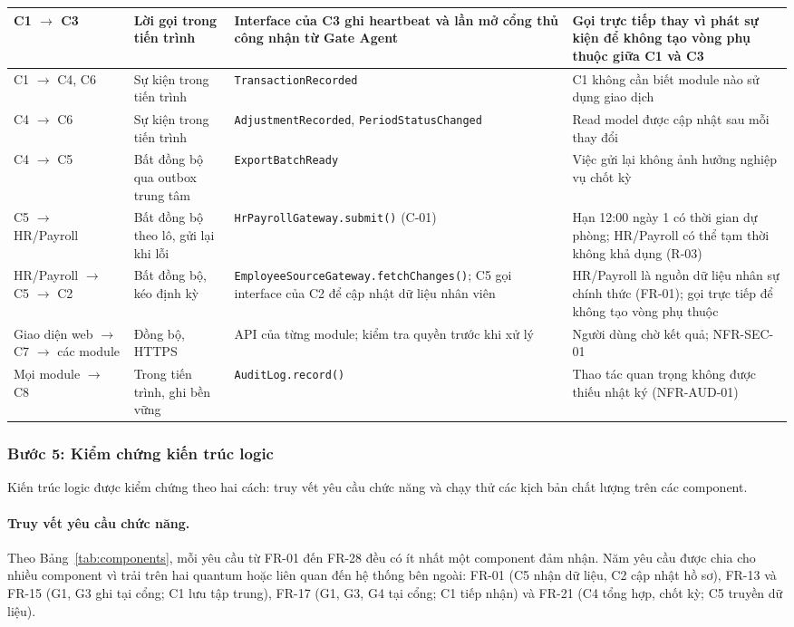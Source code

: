 \begin{longtable}{|>{\raggedright\arraybackslash}p{2.9cm}|>{\raggedright\arraybackslash}p{3.1cm}|>{\raggedright\arraybackslash}p{4.9cm}|>{\raggedright\arraybackslash}p{4.4cm}|}
\hline
C1 $\rightarrow$ C3 & Lời gọi trong tiến trình & Interface của C3 ghi heartbeat và lần mở cổng thủ công nhận từ Gate Agent & Gọi trực tiếp thay vì phát sự kiện để không tạo vòng phụ thuộc giữa C1 và C3 \\
\hline
C1 $\rightarrow$ C4, C6 & Sự kiện trong tiến trình & \texttt{TransactionRecorded} & C1 không cần biết module nào sử dụng giao dịch \\
\hline
C4 $\rightarrow$ C6 & Sự kiện trong tiến trình & \texttt{AdjustmentRecorded}, \texttt{PeriodStatusChanged} & Read model được cập nhật sau mỗi thay đổi \\
\hline
C4 $\rightarrow$ C5 & Bất đồng bộ qua outbox trung tâm & \texttt{ExportBatchReady} & Việc gửi lại không ảnh hưởng nghiệp vụ chốt kỳ \\
\hline
C5 $\rightarrow$ HR/Payroll & Bất đồng bộ theo lô, gửi lại khi lỗi & \texttt{HrPayrollGateway.submit()} (C-01) & Hạn 12:00 ngày 1 có thời gian dự phòng; HR/Payroll có thể tạm thời không khả dụng (R-03) \\
\hline
HR/Payroll $\rightarrow$ C5 $\rightarrow$ C2 & Bất đồng bộ, kéo định kỳ & \texttt{EmployeeSourceGateway}\allowbreak\texttt{.fetchChanges()}; C5 gọi interface của C2 để cập nhật dữ liệu nhân viên & HR/Payroll là nguồn dữ liệu nhân sự chính thức (FR-01); gọi trực tiếp để không tạo vòng phụ thuộc \\
\hline
Giao diện web $\rightarrow$ C7 $\rightarrow$ các module & Đồng bộ, HTTPS & API của từng module; kiểm tra quyền trước khi xử lý & Người dùng chờ kết quả; NFR-SEC-01 \\
\hline
Mọi module $\rightarrow$ C8 & Trong tiến trình, ghi bền vững & \texttt{AuditLog.record()} & Thao tác quan trọng không được thiếu nhật ký (NFR-AUD-01) \\
\hline
\end{longtable}
\endgroup

\subsubsection{Bước 5: Kiểm chứng kiến trúc logic}\label{sec:logical-step5}
Kiến trúc logic được kiểm chứng theo hai cách: truy vết yêu cầu chức năng và chạy thử các kịch bản chất lượng trên các component.

\paragraph{Truy vết yêu cầu chức năng.} Theo Bảng~\ref{tab:components}, mỗi yêu cầu từ FR-01 đến FR-28 đều có ít nhất một component đảm nhận. Năm yêu cầu được chia cho nhiều component vì trải trên hai quantum hoặc liên quan đến hệ thống bên ngoài: FR-01 (C5 nhận dữ liệu, C2 cập nhật hồ sơ), FR-13 và FR-15 (G1, G3 ghi tại cổng; C1 lưu tập trung), FR-17 (G1, G3, G4 tại cổng; C1 tiếp nhận) và FR-21 (C4 tổng hợp, chốt kỳ; C5 truyền dữ liệu).

